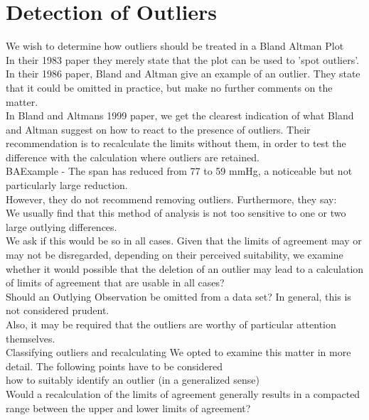 \documentclass[12pt, a4paper]{report}
\theoremstyle{plain}
\theoremstyle{definition}
\theoremstyle{remark}
\begin{document}
		\newpage
	






\section{Detection of Outliers}
We wish to determine how outliers should be treated in a Bland
Altman Plot
\\
In their 1983 paper they merely state that the plot can be used to
'spot outliers'.
\\
In  their 1986 paper, Bland and Altman give an example of an
outlier. They state that it could be omitted in practice, but make
no further comments on the matter.
\\
In Bland and Altmans 1999 paper, we get the clearest indication of
what Bland and Altman suggest on how to react to the presence of
outliers. Their recommendation is to recalculate the limits
without them, in order to test the difference with the calculation
where outliers are retained.\\

BAExample -	The span has reduced from 77 to 59 mmHg, a noticeable but not
particularly large reduction.
\\
However, they do not recommend removing outliers. Furthermore,
they say:
\\
We usually find that this method of analysis is not too sensitive
to one or two large outlying differences.
\\
We ask if this would be so in all cases. Given that the limits of
agreement may or may not be disregarded, depending on their
perceived suitability, we examine whether it would possible that
the deletion of an outlier may lead to a calculation of limits of
agreement that are usable in all cases?
\\
Should an Outlying Observation be omitted from a data set? In
general, this is not considered prudent.
\\
Also, it may be required that the outliers are worthy of
particular attention themselves.
\\
Classifying outliers and recalculating We opted to examine this
matter in more detail. The following points have to be considered
\\how to suitably identify an outlier (in a generalized sense)
\\Would a recalculation of the limits of agreement generally
results in  a compacted range between the upper and lower limits
of agreement?
\end{document}
